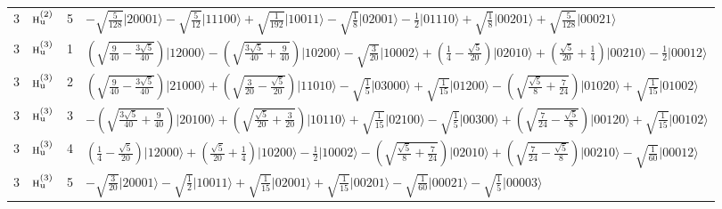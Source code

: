 \documentclass[11pt]{article}
\newcommand{\irr}[1]{\text{\normalfont\scshape #1}}
\newcommand{\ptag}[1]{\mathrm{#1}}
\newcommand{\occ}[1]{\lvert #1\rangle}
\begin{document}
\begin{longtable}{c l c p{}}
3 & $\irr{h}_{\ptag{u}}^{(2)}$ & 5 & $-\sqrt{\tfrac{5}{128}}\occ{20001}-\sqrt{\tfrac{5}{12}}\occ{11100}+\sqrt{\tfrac{1}{192}}\occ{10011}-\sqrt{\tfrac{1}{8}}\occ{02001}-\tfrac{1}{2}\occ{01110}+\sqrt{\tfrac{1}{8}}\occ{00201}+\sqrt{\tfrac{5}{128}}\occ{00021}$\\
3 & $\irr{h}_{\ptag{u}}^{(3)}$ & 1 & $(\sqrt{\frac{9}{40} - \frac{3 \sqrt{5}}{40}})\occ{12000}-(\sqrt{\frac{3 \sqrt{5}}{40} + \frac{9}{40}})\occ{10200}-\sqrt{\tfrac{3}{20}}\occ{10002}+(\frac{1}{4} - \frac{\sqrt{5}}{20})\occ{02010}+(\frac{\sqrt{5}}{20} + \frac{1}{4})\occ{00210}-\tfrac{1}{2}\occ{00012}$\\
3 & $\irr{h}_{\ptag{u}}^{(3)}$ & 2 & $(\sqrt{\frac{9}{40} - \frac{3 \sqrt{5}}{40}})\occ{21000}+(\sqrt{\frac{3}{20} - \frac{\sqrt{5}}{20}})\occ{11010}-\sqrt{\tfrac{1}{5}}\occ{03000}+\sqrt{\tfrac{1}{15}}\occ{01200}-(\sqrt{\frac{\sqrt{5}}{8} + \frac{7}{24}})\occ{01020}+\sqrt{\tfrac{1}{15}}\occ{01002}$\\
3 & $\irr{h}_{\ptag{u}}^{(3)}$ & 3 & $-(\sqrt{\frac{3 \sqrt{5}}{40} + \frac{9}{40}})\occ{20100}+(\sqrt{\frac{\sqrt{5}}{20} + \frac{3}{20}})\occ{10110}+\sqrt{\tfrac{1}{15}}\occ{02100}-\sqrt{\tfrac{1}{5}}\occ{00300}+(\sqrt{\frac{7}{24} - \frac{\sqrt{5}}{8}})\occ{00120}+\sqrt{\tfrac{1}{15}}\occ{00102}$\\
3 & $\irr{h}_{\ptag{u}}^{(3)}$ & 4 & $(\frac{1}{4} - \frac{\sqrt{5}}{20})\occ{12000}+(\frac{\sqrt{5}}{20} + \frac{1}{4})\occ{10200}-\tfrac{1}{2}\occ{10002}-(\sqrt{\frac{\sqrt{5}}{8} + \frac{7}{24}})\occ{02010}+(\sqrt{\frac{7}{24} - \frac{\sqrt{5}}{8}})\occ{00210}-\sqrt{\tfrac{1}{60}}\occ{00012}$\\
3 & $\irr{h}_{\ptag{u}}^{(3)}$ & 5 & $-\sqrt{\tfrac{3}{20}}\occ{20001}-\sqrt{\tfrac{1}{2}}\occ{10011}+\sqrt{\tfrac{1}{15}}\occ{02001}+\sqrt{\tfrac{1}{15}}\occ{00201}-\sqrt{\tfrac{1}{60}}\occ{00021}-\sqrt{\tfrac{1}{5}}\occ{00003}$\\
\hline
\end{longtable}
\end{document}
